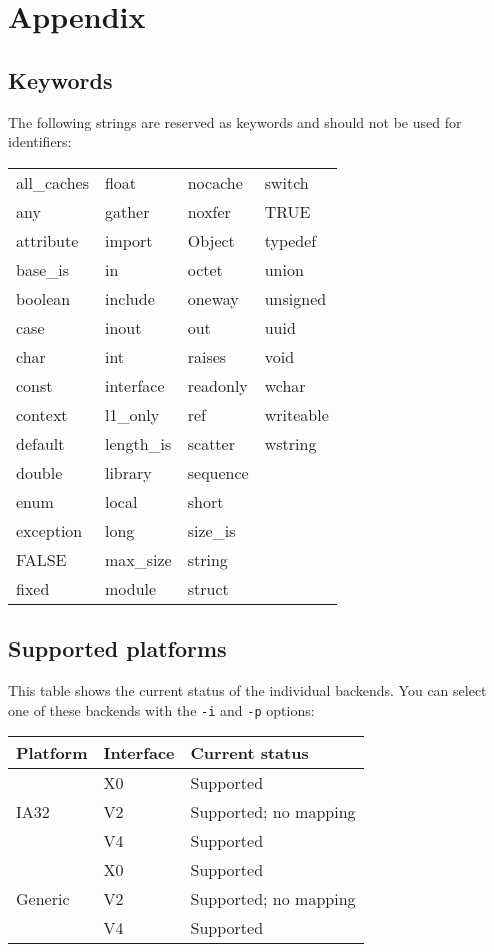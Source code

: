 \chapter{Appendix}

\section{Keywords}

The following strings are reserved as keywords and should not be used
for identifiers:

\medskip\begin{center}
\begin{tabular}{|p{3cm}|p{3cm}|p{3cm}|p{3cm}|}
\hline
all\_caches 	& float 	& nocache	& switch	\\
any 		& gather	& noxfer	& TRUE		\\
attribute 	& import	& Object	& typedef	\\
base\_is 	& in		& octet		& union		\\
boolean 	& include	& oneway	& unsigned	\\
case 		& inout		& out		& uuid	 	\\
char 		& int		& raises	& void		\\
const 		& interface	& readonly	& wchar		\\
context 	& l1\_only	& ref		& writeable	\\
default 	& length\_is	& scatter	& wstring	\\
double 		& library	& sequence	& 		\\
enum 		& local		& short		& 		\\
exception 	& long		& size\_is	& 		\\
FALSE 		& max\_size	& string	&		\\
fixed 		& module	& struct	&		\\
\hline
\end{tabular}
\end{center}\medskip

\section{Supported platforms}

This table shows the current status of the individual \IDL backends. 
You can select one of these backends with the \texttt{-i} and \texttt{-p}
options:

\begin{center}\begin{tabular}{|l|l|l|}
\hline
Platform & Interface & Current status\\
\hline
\multirow{3}{2cm}{IA32}&X0&Supported\\
&V2&Supported; no mapping\\
&V4&Supported\\
\hline
\multirow{3}{2cm}{Generic}&X0&Supported\\
&V2&Supported; no mapping\\
&V4&Supported\\
\hline
\end{tabular}\end{center}

